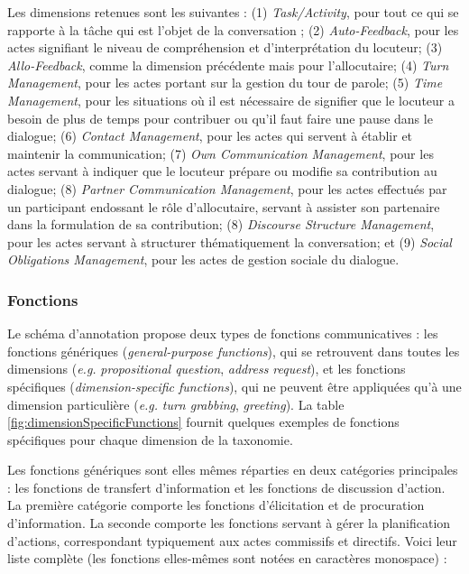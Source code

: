 \documentclass[10pt,a4paper,twoside]{article}
\begin{document}
Les dimensions retenues sont les suivantes : (1) \textit{Task/Activity}, pour tout ce qui se rapporte à la tâche qui est l'objet de la conversation ; (2) \textit{Auto-Feedback}, pour les actes signifiant le niveau de compréhension et d'interprétation du locuteur; (3) \textit{Allo-Feedback}, comme la dimension précédente mais pour l'allocutaire; (4) \textit{Turn Management}, pour les actes portant sur la gestion du tour de parole; (5) \textit{Time Management}, pour les situations où il est nécessaire de signifier que le locuteur a besoin de plus de temps pour contribuer ou qu'il faut faire une pause dans le dialogue; (6) \textit{Contact Management}, pour les actes qui servent à établir et maintenir la communication; (7) \textit{Own Communication Management}, pour les actes servant à indiquer que le locuteur prépare ou modifie sa contribution au dialogue; (8) \textit{Partner Communication Management}, pour les actes effectués par un participant endossant le rôle d'allocutaire, servant à assister son partenaire dans la formulation de sa contribution; (8) \textit{Discourse Structure Management}, pour les actes servant à structurer thématiquement la conversation; et (9) \textit{Social Obligations Management}, pour les actes de gestion sociale du dialogue.

\subsubsection{Fonctions}

Le schéma d'annotation propose deux types de fonctions communicatives : les fonctions génériques (\textit{general-purpose functions}), qui se retrouvent dans toutes les dimensions (\textit{e.g.} \textit{propositional question}, \textit{address request}), et les fonctions spécifiques (\textit{dimension-specific functions}), qui ne peuvent être appliquées qu'à une dimension particulière (\textit{e.g.} \textit{turn grabbing}, \textit{greeting}). La table \ref{fig:dimensionSpecificFunctions} fournit quelques exemples de fonctions spécifiques pour chaque dimension de la taxonomie.

Les fonctions génériques sont elles mêmes réparties en deux catégories principales : les fonctions de transfert d'information et les fonctions de discussion d'action. La première catégorie comporte les fonctions d'élicitation et de procuration d'information. La seconde comporte les fonctions servant à gérer la planification d'actions, correspondant typiquement aux actes commissifs et directifs. Voici leur liste complète (les fonctions elles-mêmes sont notées en caractères monospace) :
\end{document}
